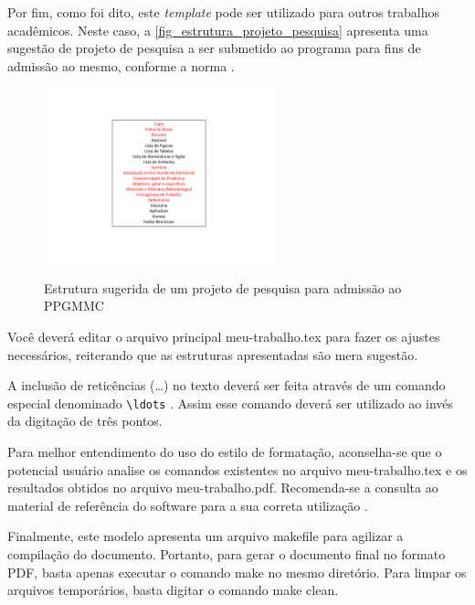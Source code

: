 \begin{apendicesenv}
    Por fim, como foi dito, este \emph{template} pode ser utilizado para outros trabalhos acadêmicos.
    Neste caso, a \autoref{fig_estrutura_projeto_pesquisa} apresenta uma sugestão de projeto de pesquisa a ser submetido ao programa para fins de admissão ao mesmo, conforme a norma .

    \begin{figure}[!htb]
        \centering
        \caption{Estrutura sugerida de um projeto de pesquisa para admissão ao PPGMMC}
        \includegraphics[width=0.6\textwidth]{figuras/estrutura-projeto-pesquisa}
        \label{fig_estrutura_projeto_pesquisa}
    \end{figure}

    Você deverá editar o arquivo principal {\color{red} meu-trabalho.tex} para fazer os ajustes necessários, reiterando que as estruturas apresentadas são mera sugestão.

    A inclusão de reticências (\ldots) no texto deverá ser feita através de um comando especial denominado \verb|\ldots| \cite{LaTeX2014}.
    Assim esse comando deverá ser utilizado ao invés da digitação de três pontos.

    Para melhor entendimento do uso do estilo de formatação, aconselha-se que o potencial usuário analise os comandos existentes no arquivo {\color{red} meu-trabalho.tex} e os resultados obtidos no arquivo {\color{red} meu-trabalho.pdf}.
    Recomenda-se a consulta ao material de referência do software para a sua correta utilização \cite{Lamport1986,Buerger1989,Kopka2003,Mittelbach2004}.

    Finalmente, este modelo apresenta um arquivo {\color{red} makefile} para agilizar a compilação do documento.
    Portanto, para gerar o documento final no formato PDF, basta apenas executar o comando {\color{red} make} no mesmo diretório.
    Para limpar os arquivos temporários, basta digitar o comando {\color{red} make clean}.


\end{apendicesenv}
